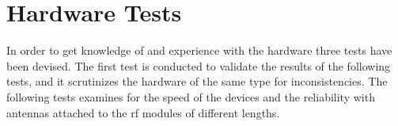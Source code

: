 \section{Hardware Tests} %
\label{sec:hardware_tests}
In order to get knowledge of and experience with the hardware three tests have been devised.
The first test is conducted to validate the results of the following tests, and it scrutinizes the hardware of the same type for inconsistencies.
The following tests examines for the speed of the devices and the reliability with antennas attached to the \gls{rf} modules of different lengths.

% 
% 
